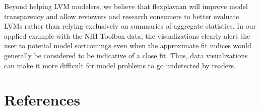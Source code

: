 \documentclass[
  english,
  doc]{apa6}
\begin{document}
Beyond helping LVM modelers, we believe that flexplavaan will improve model transparency and allow reviewers and research consumers to better evaluate LVMs rather than relying exclusively on summaries of aggregate statistics. In our applied example with the NIH Toolbox data, the visualizations clearly alert the user to potetial model sortcomings even when the approximate fit indices would generally be considered to be indicative of a close fit. Thus, data visualizations can make it more difficult for model problems to go undetected by readers.

\hypertarget{references}{%
\section*{References}\label{references}}
\end{document}
